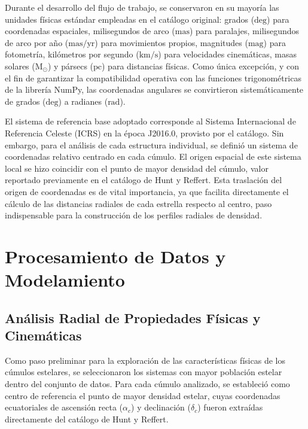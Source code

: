            Durante el desarrollo del flujo de trabajo, se conservaron en su 
            mayoría las unidades físicas estándar empleadas en el catálogo 
            original: grados ($\text{deg}$) para coordenadas espaciales, 
            milisegundos de arco ($\text{mas}$) para paralajes, milisegundos de 
            arco por año ($\text{mas/yr}$) para movimientos propios, magnitudes 
            ($\text{mag}$) para fotometría, kilómetros por segundo 
            ($\text{km/s}$) para velocidades cinemáticas, masas solares 
            ($\text{M}_\odot$) y pársecs ($\text{pc}$) para distancias físicas. 
            Como única excepción, y con el fin de garantizar la compatibilidad 
            operativa con las funciones trigonométricas de la librería NumPy, 
            las coordenadas angulares se convirtieron sistemáticamente de grados 
            ($\text{deg}$) a radianes ($\text{rad}$).

            El sistema de referencia base adoptado corresponde al Sistema 
            Internacional de Referencia Celeste (ICRS) en la época J2016.0, 
            provisto por el catálogo. Sin embargo, para el análisis de cada 
            estructura individual, se definió un sistema de coordenadas relativo 
            centrado en cada cúmulo. El origen espacial de este sistema local se 
            hizo coincidir con el punto de mayor densidad del cúmulo, valor 
            reportado previamente en el catálogo de Hunt y Reffert. Esta 
            traslación del origen de coordenadas es de vital importancia, ya que 
            facilita directamente el cálculo de las distancias radiales de cada 
            estrella respecto al centro, paso indispensable para la construcción 
            de los perfiles radiales de densidad.

\section{Procesamiento de Datos y Modelamiento}

        \subsection{Análisis Radial de Propiedades Físicas y Cinemáticas}

            Como paso preliminar para la exploración de las características 
            físicas de los cúmulos estelares, se seleccionaron los sistemas con 
            mayor población estelar dentro del conjunto de datos. Para cada 
            cúmulo analizado, se estableció como centro de referencia el punto 
            de mayor densidad estelar, cuyas coordenadas ecuatoriales de 
            ascensión recta ($\alpha_c$) y declinación ($\delta_c$) fueron 
            extraídas directamente del catálogo de Hunt y Reffert.

